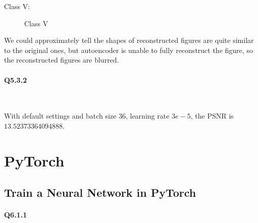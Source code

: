 \documentclass[11pt]{article} \usepackage{fullpage} \usepackage{graphicx} \usepackage{epstopdf} \usepackage{color} \usepackage{psfrag} \usepackage{pdfsync}\usepackage{indentfirst}\usepackage{subfigure}\usepackage{float}\usepackage[section]{placeins}
\begin{document}
Class $\mathrm{V}$:
\begin{figure}[H]
\centering
{}
\caption{Class V}
\end{figure}

We could approximately tell the shapes of reconstructed figures are quite similar to the original ones, but autoencoder is unable to fully reconstruct the figure, so the reconstructed figures are blurred.

\paragraph{Q5.3.2}~{}

With default settings and batch size $36$, learning rate $3e-5$, the $\mathrm{PSNR}$ is $13.52373364094888$.

\section{PyTorch}
\subsection{Train a Neural Network in PyTorch}
\paragraph{Q6.1.1}~{}
\end{document}
